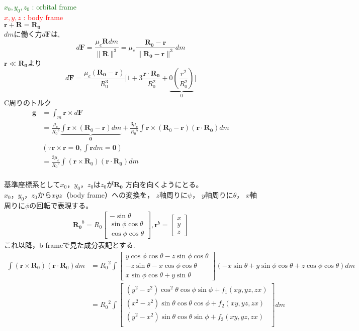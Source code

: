 \documentclass[class=article, crop=false, dvipdfmx, fleqn]{standalone}
\begin{document}
\noindent
\textcolor{darkgreen}{$x_0, y_0, z_0$ : orbital frame}\\
\textcolor{red}{$x, y, z$ : body frame}\\
$\bm{r}+\bm{R}=\bm{R_0}$\\
$dm$に働く力$d\bm{F}$は,
\begin{equation}
d\bm{F} = 
\frac{\mu_e \bm{R} dm}{\|\bm{R}\| ^3} =
\mu_e \frac{\bm{R_0} - \bm{r}}{\| \bm{R_0} - \bm{r} \| ^3} dm
\end{equation}
$\bm{r}\ll \bm{R_0}$より
\begin{equation}
d\bm{F} = \frac{\mu_e(\bm{R_0} -\bm{r})}{R_0^3}
\bigl[ 1 + 3\frac{\bm{r} \cdot \bm{R_0}}{R_0^2} + \underbrace{\mathrm{0}(\frac{r^2}{R_0^2})}_{0} \bigr]
\end{equation}
C周りのトルク
\begin{align}
\bm{g} &=
\int_m \bm{r} \times d\bm{F}\\ 
&=\frac{\mu_e}{{R_0}^3} 
\underbrace{\int \bm{r}\times
(\bm{R}_0 - \bm{r})dm}_{\bm{0}}
+\frac{3\mu_e}{{R_0}^5} \int \bm{r}\times (\bm{R}_0-\bm{r})
(\bm{r} \cdot \bm{R_0})dm\\
&(\because \bm{r}\times\bm{r}=\bm{0}
,\int \bm{r}dm=\bm{0})
\\
&= \frac{3\mu_e}{{R_0}^5} \int (\bm{r} \times \bm{R}_0) ( \bm{r} \cdot \bm{R_0} )dm
\end{align}\\
基準座標系として$x_0$，$y_0$，$z_0$は$z_0$が$\bm{R_0}$
方向を向くようにとる。\\
$x_0$，$y_0$，$z_0$から$xyz$（body frame）への変換を，
$z$軸周りに$\psi$，
$y$軸周りに$\theta$，
$x$軸周りに$\phi$の回転で表現する。
\begin{align}
\bm{R_0}^b=R_0
\begin{bmatrix}
-\sin\theta\\
\sin\phi\cos\theta\\
\cos\phi\cos\theta
\end{bmatrix},
\bm{r}^b=
\begin{bmatrix}
x\\
y\\
z
\end{bmatrix}
\end{align}
これ以降，b-frameで見た成分表記とする.
\begin{align}
\int(\bm{r}\times\bm{R}_0)
(\bm{r}\cdot\bm{R}_0)dm
&={R_0}^2 \int
\begin{bmatrix}
y\cos\phi\cos\theta  -z\sin\phi\cos\theta\\
-z\sin\theta -x\cos\phi\cos\theta\\
x\sin\phi\cos\theta + y\sin\theta
\end{bmatrix}
(-x\sin\theta+
y\sin\phi\cos\theta+
z\cos\phi\cos\theta)dm\\
&={R_0}^2\int
\begin{bmatrix}
(y^2-z^2)
\cos^2\theta\cos\phi\sin\phi
+f_1(xy,yz,zx)\\
(x^2-z^2)\sin\theta\cos\theta\cos\phi
+f_2(xy,yz,zx)\\
(y^2-x^2)\sin\theta\cos\theta\sin\phi+
f_3(xy,yz,zx)\\
\end{bmatrix}dm
\end{align}
\end{document}
